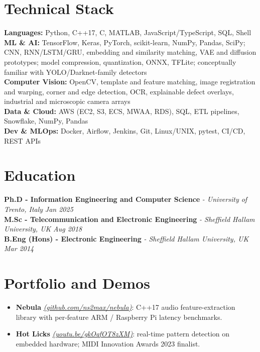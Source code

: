 \documentclass[11pt]{article}
\begin{document}
\section*{Technical Stack}

\textbf{Languages:} Python, C++17, C, MATLAB, JavaScript/TypeScript, SQL, Shell\\
\textbf{ML \& AI:} TensorFlow, Keras, PyTorch, scikit-learn, NumPy, Pandas, SciPy; CNN, RNN/LSTM/GRU, embedding and similarity matching, VAE and diffusion prototypes; model compression, quantization, ONNX, TFLite; conceptually familiar with YOLO/Darknet-family detectors\\
\textbf{Computer Vision:} OpenCV, template and feature matching, image registration and warping, corner and edge detection, OCR, explainable defect overlays, industrial and microscopic camera arrays\\
\textbf{Data \& Cloud:} AWS (EC2, S3, ECS, MWAA, RDS), SQL, ETL pipelines, Snowflake, NumPy, Pandas\\
\textbf{Dev \& MLOps:} Docker, Airflow, Jenkins, Git, Linux/UNIX, pytest, CI/CD, REST APIs

\section*{Education}
\textbf{Ph.D - Information Engineering and Computer Science} \textit{\small{ - University of Trento, Italy}} \hfill \textit{Jan 2025}\\[2pt]
\noindent\textbf{M.Sc - Telecommunication and Electronic Engineering} \textit{\small{ - Sheffield Hallam University, UK}} \hfill \textit{Aug 2018}\\[2pt]
\noindent\textbf{B.Eng (Hons) - Electronic Engineering} \textit{\small{ - Sheffield Hallam University, UK}} \hfill \textit{Mar 2014}

\section*{Portfolio and Demos \footnotesize {}}
\begin{itemize}[leftmargin=1.2em, itemsep=-0.25em]
    \item \textbf{Nebula} \href{https://github.com/ns2max/nebula}{\textit{(github.com/ns2max/nebula)}}: C++17 audio feature-extraction library with per-feature ARM / Raspberry Pi latency benchmarks.
    \item \textbf{Hot Licks} \href{https://youtu.be/gkOqfOT8zXM}{\textit{(youtu.be/gkOqfOT8zXM)}}: real-time pattern detection on embedded hardware; MIDI Innovation Awards 2023 finalist.
\end{itemize}
\end{document}
